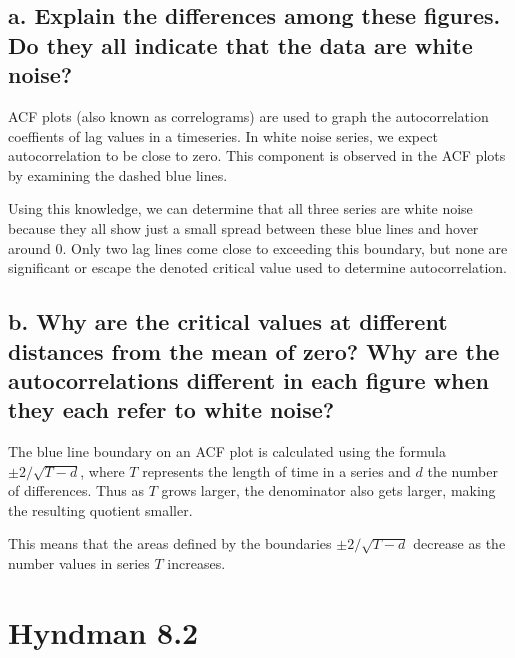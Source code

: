 \documentclass[openany]{book}
\begin{document}
\hypertarget{a.-explain-the-differences-among-these-figures.-do-they-all-indicate-that-the-data-are-white-noise}{%
\subsection{a. Explain the differences among these figures. Do they all indicate that the data are white noise?}\label{a.-explain-the-differences-among-these-figures.-do-they-all-indicate-that-the-data-are-white-noise}}

ACF plots (also known as correlograms) are used to graph the autocorrelation coeffients of lag values in a timeseries. In white noise series, we expect autocorrelation to be close to zero. This component is observed in the ACF plots by examining the dashed blue lines.

Using this knowledge, we can determine that all three series are white noise because they all show just a small spread between these blue lines and hover around 0. Only two lag lines come close to exceeding this boundary, but none are significant or escape the denoted critical value used to determine autocorrelation.

\hypertarget{b.-why-are-the-critical-values-at-different-distances-from-the-mean-of-zero-why-are-the-autocorrelations-different-in-each-figure-when-they-each-refer-to-white-noise}{%
\subsection{b. Why are the critical values at different distances from the mean of zero? Why are the autocorrelations different in each figure when they each refer to white noise?}\label{b.-why-are-the-critical-values-at-different-distances-from-the-mean-of-zero-why-are-the-autocorrelations-different-in-each-figure-when-they-each-refer-to-white-noise}}

The blue line boundary on an ACF plot is calculated using the formula \(\pm 2 / \sqrt{T-d}\), where \(T\) represents the length of time in a series and \(d\) the number of differences. Thus as \(T\) grows larger, the denominator also gets larger, making the resulting quotient smaller.

This means that the areas defined by the boundaries \(\pm 2 / \sqrt{T-d}\) decrease as the number values in series \(T\) increases.

\hypertarget{hyndman-8.2}{%
\section{Hyndman 8.2}\label{hyndman-8.2}}
\end{document}
